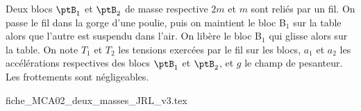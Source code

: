 \finEntrainement



\newpage


\hauteurLargeurCadreReponse		{6mm}{3cm}
\typeEntrainement				{} %
\initialisationEntrainement


                                \initialisationPartieGauche %
Deux blocs $\ptB_1$ et $\ptB_2$ de masse respective $2m$ et $m$ sont reliés par un fil. %
On passe le fil dans la gorge d'une poulie, %
puis on maintient le bloc B$_{1}$ sur la table alors que l'autre est suspendu dans l'air. On libère le bloc B$_{1}$ qui glisse alors sur la table. On note $T_1$ et $T_2$ les tensions exercées par le fil sur les blocs, $a_1$ et $a_2$ les accélérations respectives des blocs $\ptB_1$ et $\ptB_2$, et $g$ le champ de pesanteur. Les frottements sont négligeables.
                                \initialisationPartieDroite %
\begin{center}
{fiche_MCA02_deux_masses_JRL_v3.tex}
\end{center}
                               \finalisationDuPartageDePage %


